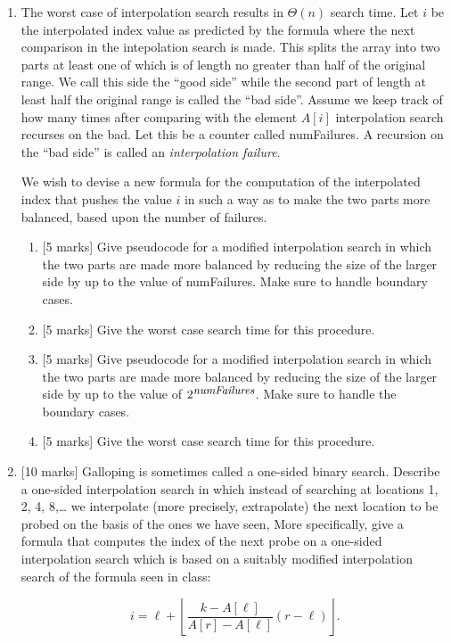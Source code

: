 \documentclass[11pt]{article}
\begin{document}
\begin{enumerate}

\item The worst case of interpolation search results in $\Theta(n)$ search
time. Let $i$ be the interpolated index value as predicted by the formula where
the next comparison in the intepolation search is made. This
splits the array into two parts at least one of which is of length no 
greater than half of the original range. We call this side the ``good side''
while the second part of length at least half the original range is called
the ``bad side''. Assume we keep track of how many times after comparing with
the element $A[i]$ interpolation search recurses on the bad. Let this be a counter called numFailures. A recursion on the ``bad side'' is called an \emph{interpolation
failure}. 

We wish to devise a new formula for the computation of the interpolated index that
pushes the value $i$ in such a way as to make the two parts more balanced, based upon the
number of failures.
\begin{enumerate}
\item {[5 marks]}  Give pseudocode for a modified interpolation search
in which the two parts are made more balanced 
by reducing the size of the larger side by up to the value of numFailures.
Make sure to handle boundary cases.
\item {[5 marks]}  Give the worst case search time for this procedure.
\item {[5 marks]}  Give pseudocode for a modified interpolation search
in which the two parts are made more balanced
by reducing the size of the larger side by up to the value of $2^{\mbox{\small\it numFailures}}$.
Make sure to handle the boundary cases.
\item {[5 marks]} Give the worst case search time for this procedure.
\end{enumerate}


\item {[10 marks]}  
Galloping is sometimes called a one-sided binary search. Describe a one-sided
interpolation search in which instead of searching at locations 1, 2, 4, 8,\ldots
we interpolate (more precisely, extrapolate) 
the next location to be probed on the basis of the ones we
have seen, More specifically, give a formula that computes the index of the
next probe on a one-sided interpolation search which is based on a suitably modified 
interpolation search of the formula seen in class:

\[ i = \ell+\left\lfloor\frac{k-A[\ell]}{A[r]-A[\ell]}(r-\ell)\right\rfloor. \]


\end{enumerate}
\end{document}

